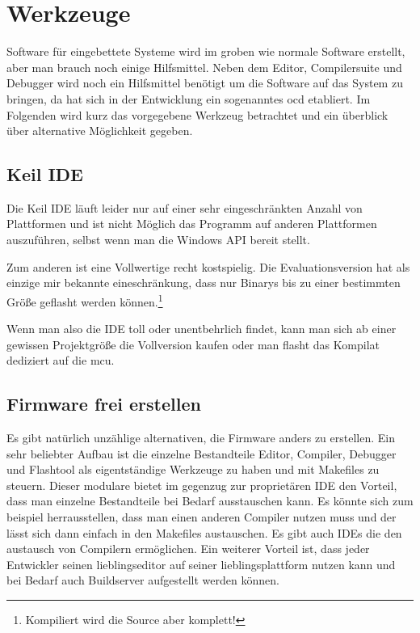 \section{Werkzeuge}

Software für eingebettete Systeme wird im groben wie normale Software erstellt, aber man brauch noch einige Hilfsmittel. Neben dem Editor, Compilersuite und Debugger wird noch ein Hilfsmittel benötigt um die Software auf das System zu bringen, da hat sich in der Entwicklung ein sogenanntes \gls{ocd} etabliert.
Im Folgenden wird kurz das vorgegebene Werkzeug betrachtet und ein überblick über alternative Möglichkeit gegeben.


\subsection{Keil IDE}

Die Keil IDE läuft leider nur auf einer sehr eingeschränkten Anzahl von Plattformen und ist nicht Möglich das Programm auf anderen Plattformen auszuführen, selbst wenn man die Windows API bereit stellt.

Zum anderen ist eine Vollwertige recht kostspielig. Die Evaluationsversion hat als einzige mir bekannte eineschränkung, dass nur Binarys bis zu einer bestimmten Größe geflasht werden können.\footnote{Kompiliert wird die Source aber komplett!}

Wenn man also die IDE toll oder unentbehrlich findet, kann man sich ab einer gewissen Projektgröße die Vollversion kaufen oder man flasht das Kompilat dediziert auf die \gls{mcu}.

\subsection{Firmware frei erstellen}

Es gibt natürlich unzählige alternativen, die Firmware anders zu erstellen. 
Ein sehr beliebter Aufbau ist die einzelne Bestandteile Editor, Compiler, Debugger und Flashtool als eigentständige Werkzeuge zu haben und mit Makefiles zu steuern.
Dieser modulare bietet im gegenzug zur proprietären IDE den Vorteil, dass man einzelne Bestandteile bei Bedarf ausstauschen kann. Es könnte sich zum beispiel herrausstellen, dass man einen anderen Compiler nutzen muss und der lässt sich dann einfach in den Makefiles austauschen. Es gibt auch IDEs die den austausch von Compilern ermöglichen. Ein weiterer Vorteil ist, dass jeder Entwickler seinen lieblingseditor auf seiner lieblingsplattform nutzen kann und bei Bedarf auch Buildserver aufgestellt werden können.


